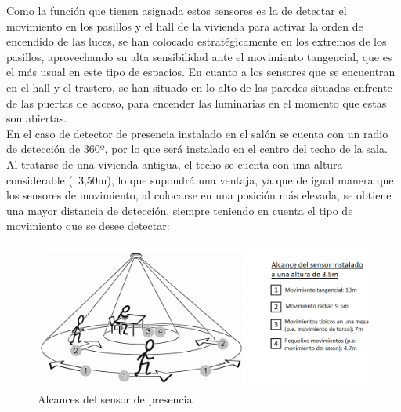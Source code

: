 Como la función que tienen asignada estos sensores es la de detectar el movimiento en los pasillos y el hall de la vivienda para activar la orden de encendido de las luces, se han colocado estratégicamente en los extremos de los pasillos, aprovechando su alta sensibilidad ante el movimiento tangencial, que es el más usual en este tipo de espacios. En cuanto a los sensores que se encuentran en el hall y el trastero, se han situado en lo alto de las paredes situadas enfrente de las puertas de acceso, para encender las luminarias en el momento que estas son abiertas.\\
En el caso de detector de presencia instalado en el salón se cuenta con un radio de detección de 360º, por lo que será instalado en el centro del techo de la sala. Al tratarse de una vivienda antigua, el techo se cuenta con una altura considerable (~3,50m), lo que supondrá una ventaja, ya que de igual manera que los sensores de movimiento, al colocarse en una posición más elevada, se obtiene una mayor distancia de detección, siempre teniendo en cuenta el tipo de movimiento que se desee detectar:
\begin{figure}[h]
\includegraphics[width=1.15\textwidth]{figures/alcance_presencia.png}   
\caption{Alcances del sensor de presencia}
\label{fig:alcance_presencia}
\end{figure}

